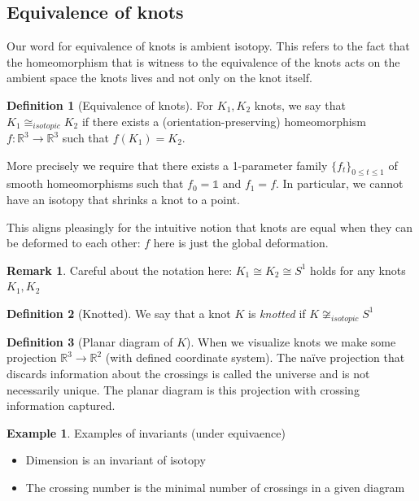\documentclass[11pt]{article}
\newcommand{\R}{\mathbb{R}}
\newcommand{\set}[1]{\{ #1 \}}
\newcommand{\identity}{\mathds{1}}
\theoremstyle{plain}
\theoremstyle{definition}
\newtheorem{remark}{Remark}
\newtheorem{definition}{Definition}
\newtheorem{ex}{Example}
\begin{document}
\subsection{Equivalence of knots}

Our word for equivalence of knots is ambient isotopy. This refers to the fact that the homeomorphism that is witness
to the equivalence of the knots acts on the ambient space the knots lives and not only on the knot itself.




\begin{definition}[Equivalence of knots]
  For $K_1, K_2$ knots, we say that $K_1 \cong_{isotopic} K_2$
  if there exists a (orientation-preserving) homeomorphism $f: \R^3 \to \R^3$ such that $f(K_1) = K_2$.

  More precisely we require that there exists a 1-parameter family $\set{f_t}_{0 \leq t \leq 1}$ of smooth homeomorphisms such that $f_0 = \identity$ and $f_1 = f$. In particular, we cannot have an isotopy that shrinks a knot to a point.

  This aligns pleasingly for the intuitive notion that knots are equal when they can be deformed to each other:
  $f$ here is just the global deformation.
\end{definition}

\begin{remark}
  Careful about the notation here: $K_1 \cong K_2 \cong S^1$ holds for any knots $K_1, K_2$
\end{remark}


\begin{definition}[Knotted]
  We say that a knot $K$ is \emph{knotted} if $K \not \cong_{isotopic} S^1$
\end{definition}


\begin{definition}[Planar diagram of $K$]
  When we visualize knots we make some projection $\R^3 \to \R^2$ (with defined coordinate system). The na\"ive projection that discards information about the crossings
  is called the universe and is not necessarily unique. The planar diagram is this projection with crossing information captured.

\end{definition}

\begin{ex}
Examples of invariants (under equivaence)
\begin{itemize}
  \item Dimension is an invariant of isotopy
  \item The crossing number is the minimal number of crossings in a given diagram
\end{itemize}
\end{ex}
\end{document}
